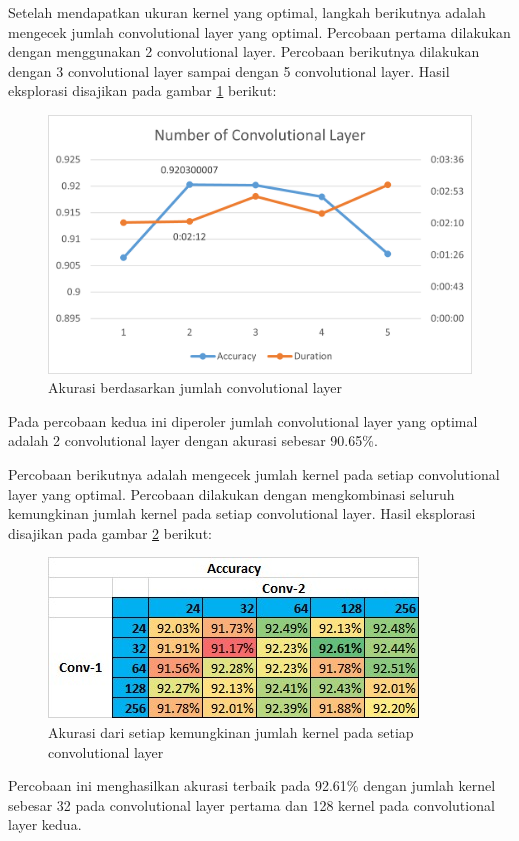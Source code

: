 \documentclass[a4, 12px]{article}
\theoremstyle{definition}
\theoremstyle{remark}
\begin{document}
Setelah mendapatkan ukuran kernel yang optimal, langkah berikutnya adalah mengecek jumlah convolutional layer yang optimal. Percobaan pertama dilakukan dengan menggunakan 2 convolutional layer. Percobaan berikutnya dilakukan dengan 3 convolutional layer sampai dengan 5 convolutional layer. Hasil eksplorasi disajikan pada gambar \ref{fig:k2} berikut:

\begin{figure}[!h]
	\centering
	\includegraphics[width=0.7\linewidth]{src/K2}
	\caption{Akurasi berdasarkan jumlah convolutional layer}
	\label{fig:k2}
\end{figure}

Pada percobaan kedua ini diperoler jumlah convolutional layer yang optimal adalah 2 convolutional layer dengan akurasi sebesar 90.65\%.

Percobaan berikutnya adalah mengecek jumlah kernel pada setiap convolutional layer yang optimal. Percobaan dilakukan dengan mengkombinasi seluruh kemungkinan jumlah kernel pada setiap convolutional layer. Hasil eksplorasi disajikan pada gambar \ref{fig:k3} berikut:

\begin{figure}[!h]
	\centering
	\includegraphics[width=0.7\linewidth]{src/K3}
	\caption{Akurasi dari setiap kemungkinan jumlah kernel pada setiap convolutional layer}
	\label{fig:k3}
\end{figure}

Percobaan ini menghasilkan akurasi terbaik pada 92.61\% dengan jumlah kernel sebesar 32 pada convolutional layer pertama dan 128 kernel pada convolutional layer kedua.
\end{document}
